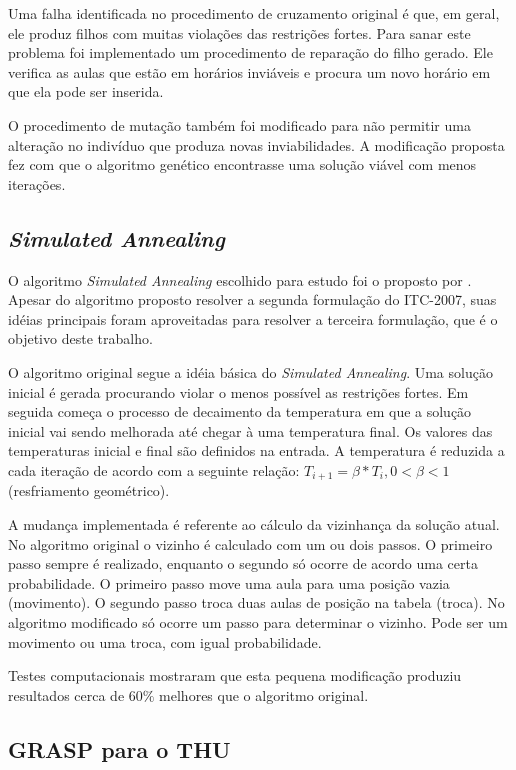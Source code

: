 \documentclass[11pt]{article}
\begin{document}
Uma falha identificada no procedimento de cruzamento original é que, em geral, ele produz filhos com muitas violações das restrições fortes. Para sanar este problema foi implementado um procedimento de reparação do filho gerado. Ele verifica as aulas que estão em horários inviáveis e procura um novo horário em que ela pode ser inserida.

O procedimento de mutação também foi modificado para não permitir uma alteração no indivíduo que produza novas inviabilidades. A modificação proposta fez com que o algoritmo genético encontrasse uma solução viável com menos iterações.

\subsection{\textit{Simulated Annealing}}

O algoritmo \textit{Simulated Annealing} escolhido para estudo foi o proposto por \cite{CDGS11b}. Apesar do algoritmo proposto resolver a segunda formulação do ITC-2007, suas idéias principais foram aproveitadas para resolver a terceira formulação, que é o objetivo deste trabalho.

O algoritmo original segue a idéia básica do \textit{Simulated Annealing}. Uma solução inicial é gerada procurando violar o menos possível as restrições fortes. Em seguida começa o processo de decaimento da temperatura em que a solução inicial vai sendo melhorada até chegar à uma temperatura final. Os valores das temperaturas inicial e final são definidos na entrada. A temperatura é reduzida a cada iteração de acordo com a seguinte relação: $T_{i+1} = \beta * T_i, 0 < \beta < 1$ (resfriamento geométrico).

A mudança implementada é referente ao cálculo da vizinhança da solução atual. No algoritmo original o vizinho é calculado com um ou dois passos. O primeiro passo sempre é realizado, enquanto o segundo só ocorre de acordo uma certa probabilidade. O primeiro passo move uma aula para uma posição vazia (movimento). O segundo passo troca duas aulas de posição na tabela (troca). No algoritmo modificado só ocorre um passo para determinar o vizinho. Pode ser um movimento ou uma troca, com igual probabilidade.

Testes computacionais mostraram que esta pequena modificação produziu resultados cerca de $60\%$ melhores que o algoritmo original.

\subsection{GRASP para o THU}
\end{document}
